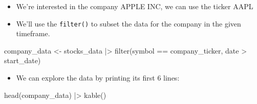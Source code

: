 \documentclass[
  letterpaper,
  DIV=11,
  numbers=noendperiod]{scrreprt}
\newenvironment{Shaded}{\begin{snugshade}}{\end{snugshade}}
\newcommand{\FunctionTok}[1]{\textcolor[rgb]{0.28,0.35,0.67}{#1}}
\newcommand{\NormalTok}[1]{\textcolor[rgb]{0.00,0.23,0.31}{#1}}
\newcommand{\OtherTok}[1]{\textcolor[rgb]{0.00,0.23,0.31}{#1}}
\newcommand{\SpecialCharTok}[1]{\textcolor[rgb]{0.37,0.37,0.37}{#1}}
\providecommand{\tightlist}{%
  \setlength{\itemsep}{0pt}\setlength{\parskip}{0pt}}\usepackage{longtable,booktabs,array}
\theoremstyle{definition}
\theoremstyle{remark}
\begin{document}
\begin{itemize}
\item
  We're interested in the company APPLE INC, we can use the ticker AAPL
\item
  We'll use the \texttt{filter()} to subset the data for the company in
  the given timeframe.
\end{itemize}

\begin{Shaded}
\begin{Highlighting}[]
\NormalTok{company\_data }\OtherTok{\textless{}{-}} 
\NormalTok{  stocks\_data }\SpecialCharTok{|\textgreater{}} 
  \FunctionTok{filter}\NormalTok{(symbol }\SpecialCharTok{==}\NormalTok{ company\_ticker, }
\NormalTok{         date }\SpecialCharTok{\textgreater{}}\NormalTok{ start\_date) }
\end{Highlighting}
\end{Shaded}

\begin{itemize}
\tightlist
\item
  We can explore the data by printing its first 6 lines:
\end{itemize}

\begin{Shaded}
\begin{Highlighting}[]
\FunctionTok{head}\NormalTok{(company\_data) }\SpecialCharTok{|\textgreater{}} 
  \FunctionTok{kable}\NormalTok{()}
\end{Highlighting}
\end{Shaded}
\end{document}
